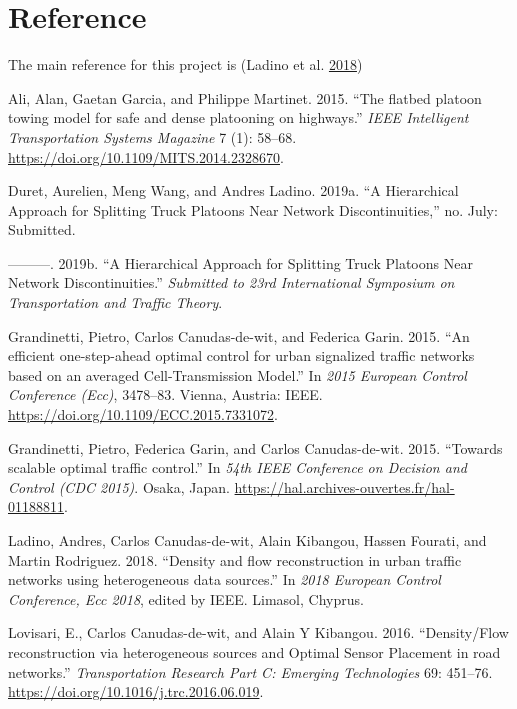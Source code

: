 \documentclass[]{book}
\theoremstyle{definition}
\theoremstyle{definition}
\theoremstyle{definition}
\theoremstyle{remark}
\begin{document}
\hypertarget{reference}{%
\section*{Reference}\label{reference}}

The main reference for this project is (Ladino et al.
\protect\hyperlink{ref-Ladino2018}{2018})

\hypertarget{refs}{}
\leavevmode\hypertarget{ref-Ali2015:ITSM}{}%
Ali, Alan, Gaetan Garcia, and Philippe Martinet. 2015. ``The flatbed
platoon towing model for safe and dense platooning on highways.''
\emph{IEEE Intelligent Transportation Systems Magazine} 7 (1): 58--68.
\url{https://doi.org/10.1109/MITS.2014.2328670}.

\leavevmode\hypertarget{ref-Duret2019:ISTTT}{}%
Duret, Aurelien, Meng Wang, and Andres Ladino. 2019a. ``A Hierarchical
Approach for Splitting Truck Platoons Near Network Discontinuities,''
no. July: Submitted.

\leavevmode\hypertarget{ref-Duret2019}{}%
---------. 2019b. ``A Hierarchical Approach for Splitting Truck Platoons
Near Network Discontinuities.'' \emph{Submitted to 23rd International
Symposium on Transportation and Traffic Theory}.

\leavevmode\hypertarget{ref-Grandinetti2015}{}%
Grandinetti, Pietro, Carlos Canudas-de-wit, and Federica Garin. 2015.
``An efficient one-step-ahead optimal control for urban signalized
traffic networks based on an averaged Cell-Transmission Model.'' In
\emph{2015 European Control Conference (Ecc)}, 3478--83. Vienna,
Austria: IEEE. \url{https://doi.org/10.1109/ECC.2015.7331072}.

\leavevmode\hypertarget{ref-Grandinetti2016}{}%
Grandinetti, Pietro, Federica Garin, and Carlos Canudas-de-wit. 2015.
``Towards scalable optimal traffic control.'' In \emph{54th IEEE
Conference on Decision and Control (CDC 2015)}. Osaka, Japan.
\url{https://hal.archives-ouvertes.fr/hal-01188811}.

\leavevmode\hypertarget{ref-Ladino2018}{}%
Ladino, Andres, Carlos Canudas-de-wit, Alain Kibangou, Hassen Fourati,
and Martin Rodriguez. 2018. ``Density and flow reconstruction in urban
traffic networks using heterogeneous data sources.'' In \emph{2018
European Control Conference, Ecc 2018}, edited by IEEE. Limasol,
Chyprus.

\leavevmode\hypertarget{ref-Lovisari2016}{}%
Lovisari, E., Carlos Canudas-de-wit, and Alain Y Kibangou. 2016.
``Density/Flow reconstruction via heterogeneous sources and Optimal
Sensor Placement in road networks.'' \emph{Transportation Research Part
C: Emerging Technologies} 69: 451--76.
\url{https://doi.org/10.1016/j.trc.2016.06.019}.
\end{document}
